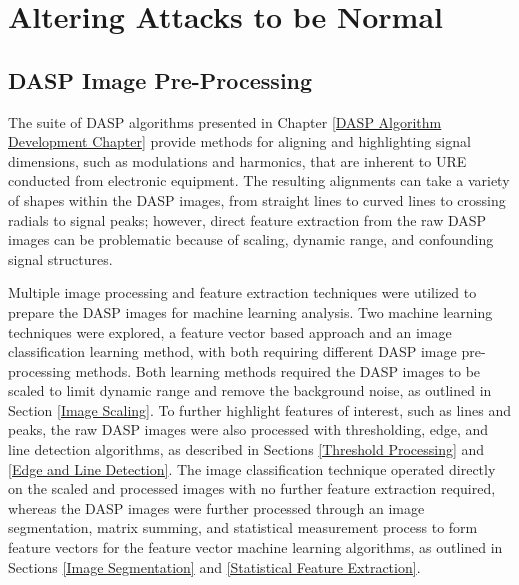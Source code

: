 
\chapter{Altering Attacks to be Normal}
\label{Altering Attacks to be Normal Chapter}

\section[DASP Image Pre-Processing]{DASP Image Pre-Processing}
\label{DASP Image Pre-Processing Section}

The suite of DASP algorithms presented in Chapter \ref{DASP Algorithm Development Chapter} provide methods for aligning and highlighting signal dimensions, such as modulations and harmonics, that are inherent to URE conducted from electronic equipment.  The resulting alignments can take a variety of shapes within the DASP images, from straight lines to curved lines to crossing radials to signal peaks; however, direct feature extraction from the raw DASP images can be problematic because of scaling, dynamic range, and confounding signal structures.

Multiple image processing and feature extraction techniques were utilized to prepare the DASP images for machine learning analysis.  Two machine learning techniques were explored, a feature vector based approach and an image classification learning method, with both requiring different DASP image pre-processing methods.  Both learning methods required the DASP images to be scaled to limit dynamic range and remove the background noise, as outlined in Section \ref{Image Scaling}.  To further highlight features of interest, such as lines and peaks, the raw DASP images were also processed with thresholding, edge, and line detection algorithms, as described in Sections \ref{Threshold Processing} and \ref{Edge and Line Detection}.  The image classification technique operated directly on the scaled and processed images with no further feature extraction required, whereas the DASP images were further processed through an image segmentation, matrix summing, and statistical measurement process to form feature vectors for the feature vector machine learning algorithms, as outlined in Sections \ref{Image Segmentation} and \ref{Statistical Feature Extraction}.

